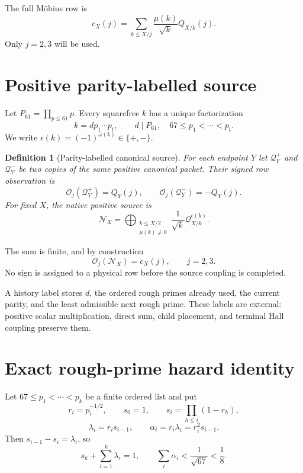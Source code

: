 \documentclass[11pt]{article}
\newtheorem{definition}[theorem]{Definition}
\newcommand{\Obs}{\mathcal O}
\newcommand{\Native}{\mathscr N}
\newcommand{\Qpack}{\mathscr Q}
\begin{document}
The full M\"obius row is
\begin{equation}
 c_X(j)=\sum_{k\le X/j}\frac{\mu(k)}{\sqrt k}Q_{X/k}(j).
\label{eq:nativerow}
\end{equation}
Only $j=2,3$ will be used.

\section{Positive parity-labelled source}
\label{sec:source}

Let $P_{61}=\prod_{p\le61}p$.  Every squarefree $k$ has a unique factorization
\begin{equation}
 k=d p_1\cdots p_t,
 \qquad d\mid P_{61},\quad 67\le p_1<\cdots<p_t.
\label{eq:factorization}
\end{equation}
We write $\epsilon(k)=(-1)^{\omega(k)}\in\{+,-\}$.

\begin{definition}[Parity-labelled canonical source]
For each endpoint $Y$ let $\Qpack_Y^+$ and $\Qpack_Y^-$ be two copies of the same positive canonical packet.  Their signed row observation is
\[
 \Obs_j(\Qpack_Y^+)=Q_Y(j),\qquad
 \Obs_j(\Qpack_Y^-)=-Q_Y(j).
\]
For fixed $X$, the native positive source is
\begin{equation}
 \Native_X=\bigoplus_{\substack{k\le X/2\\\mu(k)\ne0}}
 \frac1{\sqrt k}\Qpack_{X/k}^{\epsilon(k)}.
\label{eq:nativesource}
\end{equation}
\end{definition}
The sum is finite, and by construction
\begin{equation}
 \Obs_j(\Native_X)=c_X(j),\qquad j=2,3.
\label{eq:obsnative}
\end{equation}
No sign is assigned to a physical row before the source coupling is completed.

A history label stores $d$, the ordered rough primes already used, the current parity, and the least admissible next rough prime.  These labels are external: positive scalar multiplication, direct sum, child placement, and terminal Hall coupling preserve them.

\section{Exact rough-prime hazard identity}
\label{sec:hazard}

Let $67\le p_1<\cdots<p_k$ be a finite ordered list and put
\begin{equation}
 r_i=p_i^{-1/2},\qquad s_0=1,
 \qquad s_i=\prod_{h\le i}(1-r_h),
\end{equation}
\begin{equation}
 \lambda_i=r_i s_{i-1},\qquad
 \alpha_i=r_i\lambda_i=r_i^2s_{i-1}.
\label{eq:hazardcoeff}
\end{equation}
Then $s_{i-1}-s_i=\lambda_i$, so
\begin{equation}
 s_k+\sum_{i=1}^k\lambda_i=1,
 \qquad
 \sum_i\alpha_i<\frac1{\sqrt{67}}<\frac18.
\label{eq:budget}
\end{equation}
\end{document}
